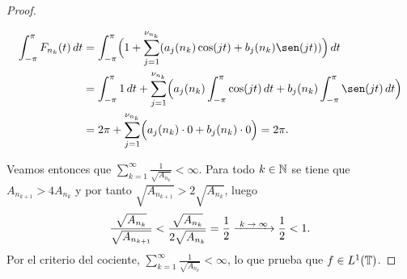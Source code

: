\documentclass[a4paper, 12pt, oneside]{book}
\begin{document}
\begin{proof}
\begin{itemize}
\begin{align*}
            \integral{-\pi}{\pi}{F_{n_k}(t)} &= \integral{-\pi}{\pi}{\Bigl(1+\sum_{j=1}^{\nu_{n_k}}(a_j(n_k)\cos(jt)+b_j(n_k)\sen(jt))\Bigr)} \\
            &= \integral{-\pi}{\pi}{1} + \sum_{j=1}^{\nu_{n_k}}\Bigl(a_j(n_k)\integral{-\pi}{\pi}{\cos(jt)}+b_j(n_k)\integral{-\pi}{\pi}{\sen(jt)}\Bigr) \\
            &=2\pi +\sum_{j=1}^{\nu_{n_k}}\Bigl(a_j(n_k)\cdot 0+b_j(n_k) \cdot 0\Bigr) =2\pi.
        \end{align*}
    \end{itemize}
    Veamos entonces que $\sum_{k=1}^\infty \frac{1}{\sqrt{A_{n_k}}} < \infty$. Para todo $k \in \mathbb N$ se tiene que $A_{n_{k+1}} > 4A_{n_{k}}$ y por tanto $\sqrt{A_{n_{k+1}}} > 2\sqrt{A_{n_{k}}}$, luego
    \[\frac{\sqrt{A_{n_k}}}{\sqrt{A_{n_{k+1}}}} < \frac{\sqrt{A_{n_k}}}{2\sqrt{A_{n_k}}} = \frac{1}{2} \kconv \frac{1}{2} < 1.\]
    Por el criterio del cociente, $\sum_{k=1}^\infty \frac{1}{\sqrt{A_{n_k}}} < \infty$, lo que prueba que $f \in L^1(\mathbb T)$. 
    

\end{proof}
\end{document}
